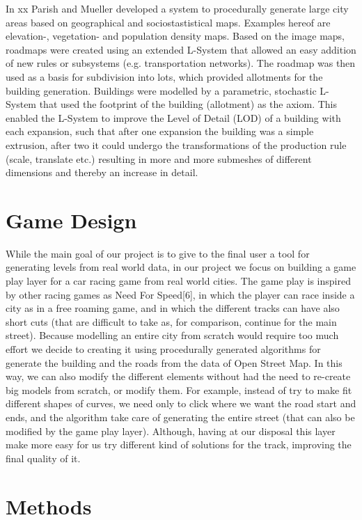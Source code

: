 \documentclass[conference]{IEEEtran}
\begin{document}
In xx Parish and Mueller \cite{parishxx} developed a system to procedurally generate large city areas based on geographical and sociostastistical maps. Examples hereof are elevation-, vegetation- and population density maps. Based on the image maps, roadmaps were created using an extended L-System that allowed an easy addition of new rules or subsystems (e.g. transportation networks). The roadmap was then used as a basis for subdivision into lots, which provided allotments for the building generation. Buildings were modelled by a parametric, stochastic L-System that used the footprint of the building (allotment) as the axiom. This enabled the L-System to improve the Level of Detail (LOD) of a building with each expansion, such that after one expansion the building was a simple extrusion, after two it could undergo the transformations of the production rule (scale, translate etc.) resulting in more and more submeshes of different dimensions and thereby an increase in detail.


\section{Game Design}

While the main goal of our project is to give to the final user a tool for generating levels from real world data, in our project we focus on building a game play layer for a car racing game from real world cities. The game play is inspired by other racing games as Need For Speed[6], in which the player can race inside a city as in a free roaming game, and in which the different tracks can have also short cuts (that are difficult to take as, for comparison, continue for the main street). Because modelling an entire city from scratch would require too much effort we decide to creating it using procedurally generated algorithms for generate the building and the roads from the data of Open Street Map. In this way, we can also modify the different elements without had the need to re-create big models from scratch, or modify them. For example, instead of try to make fit different shapes of curves, we need only to click where we want the road start and ends, and the algorithm take care of generating the entire street (that can also be modified by the game play layer). Although, having at our disposal this layer make more easy for us try different kind of solutions for the track, improving the final quality of it. 

\section{Methods}
\end{document}
